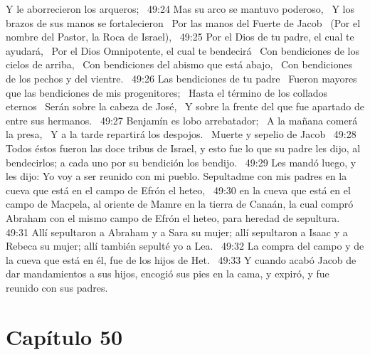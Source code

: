 Y le aborrecieron los arqueros;  
49:24 Mas su arco se mantuvo poderoso,  
Y los brazos de sus manos se fortalecieron  
Por las manos del Fuerte de Jacob  
(Por el nombre del Pastor, la Roca de Israel),  
49:25 Por el Dios de tu padre, el cual te ayudará,  
Por el Dios Omnipotente, el cual te bendecirá  
Con bendiciones de los cielos de arriba,  
Con bendiciones del abismo que está abajo,  
Con bendiciones de los pechos y del vientre.  
49:26 Las bendiciones de tu padre  
Fueron mayores que las bendiciones de mis progenitores;  
Hasta el término de los collados eternos  
Serán sobre la cabeza de José,  
Y sobre la frente del que fue apartado de entre sus hermanos.  
49:27 Benjamín es lobo arrebatador;  
A la mañana comerá la presa,  
Y a la tarde repartirá los despojos.  
Muerte y sepelio de Jacob  
49:28 Todos éstos fueron las doce tribus de Israel, y esto fue lo que su padre les dijo, al bendecirlos; a cada uno por su bendición los bendijo.  
49:29 Les mandó luego, y les dijo: Yo voy a ser reunido con mi pueblo. Sepultadme con mis padres en la cueva que está en el campo de Efrón el heteo,  
49:30 en la cueva que está en el campo de Macpela, al oriente de Mamre en la tierra de Canaán, la cual compró Abraham con el mismo campo de Efrón el heteo, para heredad de sepultura.  
49:31 Allí sepultaron a Abraham y a Sara su mujer; allí sepultaron a Isaac y a Rebeca su mujer; allí también sepulté yo a Lea.  
49:32 La compra del campo y de la cueva que está en él, fue de los hijos de Het.  
49:33 Y cuando acabó Jacob de dar mandamientos a sus hijos, encogió sus pies en la cama, y expiró, y fue reunido con sus padres.  
\section*{Capítulo 50}

